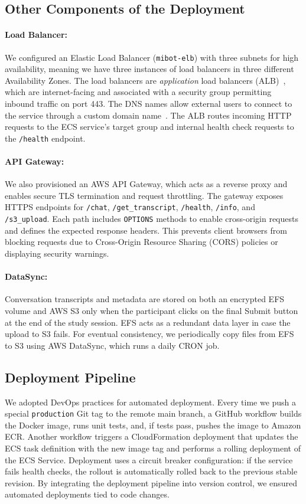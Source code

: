 \subsection{Other Components of the Deployment}

\paragraph{Load Balancer:}We configured an Elastic Load Balancer (\texttt{mibot-elb}) with three subnets for high
availability, meaning we have three instances of load balancers in three different
Availability Zones. The load balancers are \emph{application} load balancers
(ALB)~\citep{aws_alb}, which are internet-facing and associated with a security group
permitting inbound traffic on port 443. The DNS names allow external users to connect
to the service through a custom domain name~\citep{shopify_domain_seo}. The ALB routes
incoming HTTP requests to the ECS service's target group and internal health check
requests to the \texttt{/health} endpoint.

\paragraph{API Gateway:}We also provisioned an AWS API Gateway, which acts as a reverse proxy and enables
secure TLS termination and request throttling. The gateway exposes HTTPS endpoints for
\texttt{/chat}, \texttt{/get\_transcript}, \texttt{/health}, \texttt{/info}, and
\texttt{/s3\_upload}. Each path includes \texttt{OPTIONS} methods to enable
cross-origin requests and defines the expected response headers. This prevents client
browsers from blocking requests due to Cross-Origin Resource Sharing (CORS) policies or
displaying security warnings.

\paragraph{DataSync:}Conversation transcripts and metadata are stored on both an encrypted EFS volume and
AWS S3 only when the participant clicks on the final Submit button at the end of the
study session. EFS acts as a redundant data layer in case the upload to S3 fails. For
eventual consistency, we periodically copy files from EFS to S3 using AWS DataSync,
which runs a daily CRON job.

\subsection{Deployment Pipeline}
We adopted DevOps practices for automated deployment. Every time we push a special
\texttt{production} Git tag to the remote main branch, a GitHub workflow builds the
Docker image, runs unit tests, and, if tests pass, pushes the image to Amazon ECR.
Another workflow triggers a CloudFormation deployment that updates the ECS task
definition with the new image tag and performs a rolling deployment of the ECS Service.
Deployment uses a circuit breaker configuration: if the service fails health checks,
the rollout is automatically rolled back to the previous stable revision. By
integrating the deployment pipeline into version control, we ensured automated
deployments tied to code changes.
